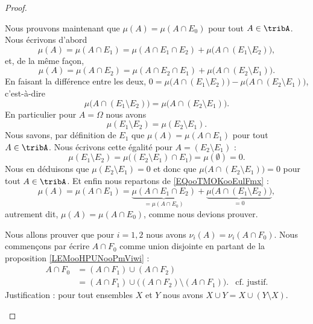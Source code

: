 \begin{proof}
\begin{subproof}
		\spitem[\( \mu(A)=\mu(A\cap E_0)\)]
		Nous prouvons maintenant que \( \mu(A)=\mu(A\cap E_0)\) pour tout \( A\in\tribA\). Nous écrivons d'abord
		\begin{equation}	\label{EQooTMOKooEulFmx}
			\mu(A)=\mu(A\cap E_1)=\mu(A\cap E_1\cap E_2)+\mu\big( A\cap(E_1\setminus E_2) \big),
		\end{equation}
		et, de la même façon,
		\begin{equation}
			\mu(A)=\mu(A\cap E_2)=\mu(A\cap E_2\cap E_1)+\mu\big( A\cap(E_2\setminus E_1) \big).
		\end{equation}
		En faisant la différence entre les deux, \( 0=\mu\big( A\cap(E_1\setminus E_2) \big)-\mu\big( A\cap(E_2\setminus E_1) \big)\), c'est-à-dire
		\begin{equation}
			\mu\big( A\cap(E_1\setminus E_2) \big)=\mu\big( A\cap(E_2\setminus E_1) \big).
		\end{equation}
		En particulier pour \( A=\Omega\) nous avons
		\begin{equation}
			\mu(E_1\setminus E_2)=\mu(E_2\setminus E_1).
		\end{equation}
		Nous savons, par définition de \( E_1\) que \( \mu(A)=\mu(A\cap E_1)\) pour tout \( A\in\tribA\). Nous écrivons cette égalité pour \( A=(E_2\setminus E_1)\) :
		\begin{equation}
			\mu(E_1\setminus E_2)=\mu\big( (E_2\setminus E_1)\cap E_1 \big)=\mu(\emptyset)=0.
		\end{equation}
		Nous en déduisons que \( \mu(E_2\setminus E_1)=0\) et donc que \( \mu\big( A\cap(E_2\setminus E_1) \big)=0\) pour tout \( A\in\tribA\). Et enfin nous repartons de \eqref{EQooTMOKooEulFmx} :
		\begin{equation}
			\mu(A)=\mu(A\cap E_1)=\underbrace{\mu(A\cap E_1\cap E_2)}_{=\mu(A\cap E_0)}+\underbrace{\mu\big( A\cap(E_1\setminus E_2) \big)}_{=0},
		\end{equation}
		autrement dit, \( \mu(A)=\mu(A\cap E_0)\), comme nous devions prouver.

		\spitem[\( \nu_i(A)=\nu_i(A\cap F_0)\)]
		Nous allons prouver que pour \( i=1,2\) nous avons \( \nu_i(A)=\nu_i(A\cap F_0)\). Nous commençons par écrire \( A\cap F_0\) comme union disjointe en partant de la proposition \ref{LEMooHPUNooPmViwi} :
		\begin{subequations}
			\begin{align}
				A\cap F_0 & =(A\cap F_1)\cup (A\cap F_2)                                                       \\
				          & =(A\cap F_1)\cup\big( (A\cap F_2)\setminus (A\cap F_1) \big). & \text{cf. justif.}
			\end{align}
		\end{subequations}
		Justification : pour tout ensembles \( X\) et \( Y\) nous avons \( X\cup Y=X\cup(Y\setminus X)\).


\end{subproof}
\end{proof}
